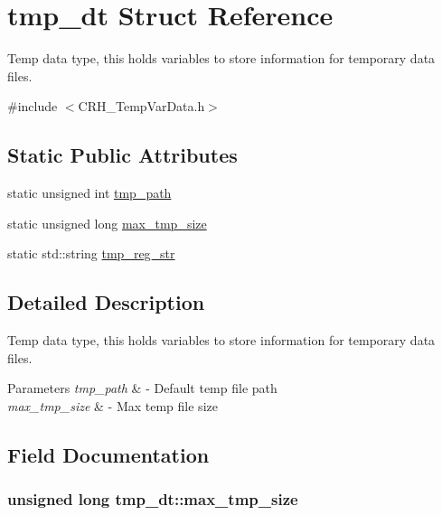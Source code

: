 \hypertarget{structtmp__dt}{}\section{tmp\+\_\+dt Struct Reference}
\label{structtmp__dt}


Temp data type, this holds variables to store information for temporary data files.  




{\ttfamily \#include $<$C\+R\+H\+\_\+\+Temp\+Var\+Data.\+h$>$}

\subsection*{Static Public Attributes}
\begin{DoxyCompactItemize}
\item 
static unsigned int \hyperlink{structtmp__dt_a5133f5ea97efb23fde6f33ec7c8d454e}{tmp\+\_\+path}
\item 
static unsigned long \hyperlink{structtmp__dt_a08d502e4fb029c95ab90a50689dab4f0}{max\+\_\+tmp\+\_\+size}
\item 
static std\+::string \hyperlink{structtmp__dt_ae8a89114cd6dda550e3d1561f6fdc7a9}{tmp\+\_\+reg\+\_\+str}
\end{DoxyCompactItemize}


\subsection{Detailed Description}
Temp data type, this holds variables to store information for temporary data files. 


\begin{DoxyParams}{Parameters}
{\em tmp\+\_\+path} & -\/ Default temp file path \\
\hline
{\em max\+\_\+tmp\+\_\+size} & -\/ Max temp file size \\
\hline
\end{DoxyParams}


\subsection{Field Documentation}
\hypertarget{structtmp__dt_a08d502e4fb029c95ab90a50689dab4f0}{}
\subsubsection[{max\+\_\+tmp\+\_\+size}]{\setlength{\rightskip}{0pt plus 5cm}unsigned long tmp\+\_\+dt\+::max\+\_\+tmp\+\_\+size\hspace{0.3cm}{\ttfamily [static]}}\label{structtmp__dt_a08d502e4fb029c95ab90a50689dab4f0}
\hypertarget{structtmp__dt_a5133f5ea97efb23fde6f33ec7c8d454e}{}
